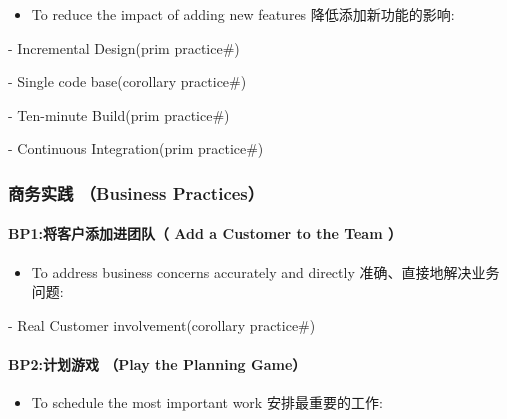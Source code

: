 \documentclass[]{article}
\providecommand{\tightlist}{%
  \setlength{\itemsep}{0pt}\setlength{\parskip}{0pt}}
\let\oldparagraph\paragraph
\renewcommand{\paragraph}[1]{\oldparagraph{#1}\mbox{}}
\begin{document}
\begin{itemize}
\tightlist
\item
  To reduce the impact of adding new features 降低添加新功能的影响:
\end{itemize}

\begin{description}
\tightlist
\item[]
- Incremental Design(prim practice\#)

- Single code base(corollary practice\#)

- Ten-minute Build(prim practice\#)

- Continuous Integration(prim practice\#)
\end{description}

\hypertarget{ux5546ux52a1ux5b9eux8df5-business-practices}{%
\subsubsection{商务实践 （Business
Practices）}\label{ux5546ux52a1ux5b9eux8df5-business-practices}}

\hypertarget{bp1ux5c06ux5ba2ux6237ux6dfbux52a0ux8fdbux56e2ux961f-add-a-customer-to-the-team}{%
\paragraph{BP1:将客户添加进团队（ Add a Customer to the Team
）}\label{bp1ux5c06ux5ba2ux6237ux6dfbux52a0ux8fdbux56e2ux961f-add-a-customer-to-the-team}}

\begin{itemize}
\tightlist
\item
  To address business concerns accurately and directly
  准确、直接地解决业务问题:
\end{itemize}

\begin{description}
\tightlist
\item[]
- Real Customer involvement(corollary practice\#)
\end{description}

\hypertarget{bp2ux8ba1ux5212ux6e38ux620f-play-the-planning-game}{%
\paragraph{BP2:计划游戏 （Play the Planning
Game）}\label{bp2ux8ba1ux5212ux6e38ux620f-play-the-planning-game}}

\begin{itemize}
\tightlist
\item
  To schedule the most important work 安排最重要的工作:\\
\end{itemize}
\end{document}
